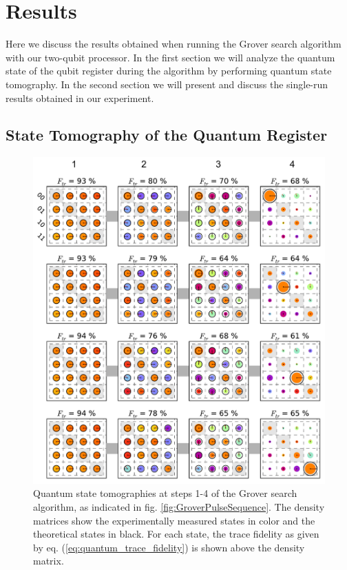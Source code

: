 \section{Results}

Here we discuss the results obtained when running the Grover search algorithm with our two-qubit processor. In the first section we will analyze the quantum state of the qubit register during the algorithm by performing quantum state tomography. In the second section we will present and discuss the single-run results obtained in our experiment.

\subsection{State Tomography of the Quantum Register}

\begin{figure}[ht!]
	\centering
		\includegraphics[width=1.\textwidth]{"./data/ct5/2011_04_21 - grover and tomo/good_data/grover algorithm - summary"}
	\caption[Quantum state tomographies at different steps during the Grover search algorithm and single-run outcome probabilities]{Quantum state tomographies at steps 1-4 of the Grover search algorithm, as indicated in fig. \ref{fig:GroverPulseSequence}. The density matrices show the experimentally measured states in color and the theoretical states in black. For each state, the trace fidelity as given by eq. (\ref{eq:quantum_trace_fidelity}) is shown above the density matrix.}
	\label{fig:GroverAlgorithmExperimentalResults}
\end{figure}

